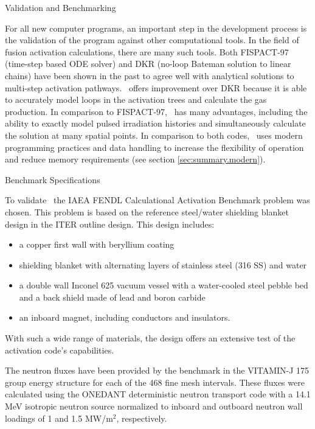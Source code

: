
\begin{chapter}{Validation and Benchmarking}
  
  For all new computer programs, an important step in the development
  process is the validation of the program against other computational
  tools.  In the field of fusion activation calculations, there are
  many such tools.  Both FISPACT-97\cite{FISPACT} (time-step based ODE
  solver) and DKR\cite{DKR} (no-loop Bateman solution to linear
  chains) have been shown in the past to agree well with analytical
  solutions to multi-step activation pathways\cite{IAEA.bench2.rep}.
  \ALARA\ offers improvement over DKR because it is able to accurately
  model loops in the activation trees and calculate the gas
  production.  In comparison to FISPACT-97, \ALARA\ has many
  advantages, including the ability to exactly model pulsed
  irradiation histories and simultaneously calculate the solution at
  many spatial points.  In comparison to both codes, \ALARA\ uses
  modern programming practices and data handling to increase the
  flexibility of operation and reduce memory requirements (see section
  \ref{sec:summary.modern}).

  \begin{section}{Benchmark Specifications}
  
    To validate \ALARA\ the IAEA FENDL Calculational Activation
    Benchmark\cite{IAEA.bench1.spec} problem was chosen.  This problem
    is based on the reference steel/water shielding blanket design in
    the ITER outline design.  This design includes:
    \begin{itemize}
    \item a copper first wall with beryllium coating
    \item shielding blanket with alternating layers of stainless steel
      (316 SS) and water
    \item a double wall Inconel 625 vacuum vessel with a water-cooled
      steel pebble bed and a back shield made of lead and boron carbide
    \item an inboard magnet, including conductors and insulators.
    \end{itemize}
    With such a wide range of materials, the design offers an
    extensive test of the activation code's capabilities.
    
    The neutron fluxes have been provided by the benchmark in the
    VITAMIN-J 175 group energy structure for each of the 468 fine mesh
    intervals.  These fluxes were calculated using the
    ONEDANT\cite{ONEDANT} deterministic neutron transport code with a
    14.1 MeV isotropic neutron source normalized to inboard and
    outboard neutron wall loadings of 1 and 1.5 MW/m$^2$,
    respectively.
    

\end{section}
\end{chapter}
